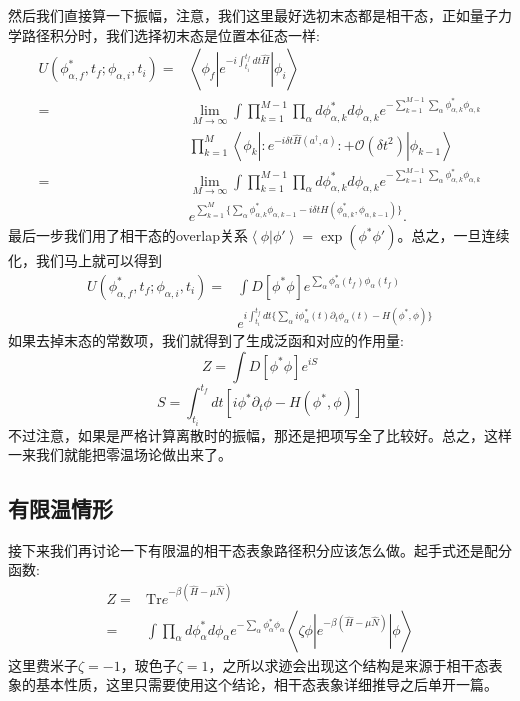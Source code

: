 \documentclass[12pt, a4paper, oneside]{ctexart}
\begin{document}
然后我们直接算一下振幅，注意，我们这里最好选初末态都是相干态，正如量子力学路径积分时，我们选择初末态是位置本征态一样:
\begin{align} 
U(\phi^*_{\alpha,f},t_f;\phi_{\alpha,i},t_i)=&\left<\phi_f |  e^{-i\int_{t_i}^{t_f}dt \hat H} | \phi_i \right>\nonumber\\ 
=&\lim_{M\rightarrow\infty}\int\prod_{k=1}^{M-1}\prod_{\alpha}d\phi^*_{\alpha,k}d\phi_{\alpha,k}e^{-\sum_{k=1}^{M-1}\sum_\alpha\phi^*_{\alpha,k}\phi_{\alpha,k}}\nonumber\\ 
&\prod_{k=1}^M\left< \phi_k | :e^{-i\delta t \hat H(a^\dagger, a)}:+\mathcal{O}(\delta t^2) |  \phi_{k-1} \right>\nonumber\\ 
=&\lim_{M\rightarrow\infty}\int\prod_{k=1}^{M-1}\prod_{\alpha}d\phi^*_{\alpha,k}d\phi_{\alpha,k}e^{-\sum_{k=1}^{M-1}\sum_\alpha\phi^*_{\alpha,k}\phi_{\alpha,k}}\nonumber\\
 &e^{\sum_{k=1}^M\{ \sum_\alpha \phi^*_{\alpha,k}\phi_{\alpha,k-1} -i\delta t H(\phi^*_{\alpha,k},\phi_{\alpha,k-1})\}}.    
\end{align}
最后一步我们用了相干态的overlap关系$\left<  \phi|\phi' \right>=\exp(\phi^*\phi')$。总之，一旦连续化，我们马上就可以得到
\begin{align} 
U(\phi^*_{\alpha,f},t_f;\phi_{\alpha,i},t_i) =&\int D[\phi^*\phi]e^{\sum_\alpha\phi^*_{\alpha}(t_f)\phi_{\alpha}(t_f)}\nonumber\\ 
&e^{i\int_{t_i}^{t_f} dt\{ \sum_\alpha i \phi^*_{\alpha}(t)\partial_t \phi_\alpha(t)-H(\phi^*,\phi) \}} 
\end{align}
如果去掉末态的常数项，我们就得到了生成泛函和对应的作用量:
\begin{equation}
    Z=\int D[\phi^*\phi]e^{iS}
\end{equation}
\begin{equation}
    S=\int_{t_i}^{t_f}dt [i\phi^*\partial_t\phi-H(\phi^*,\phi)]
\end{equation}
不过注意，如果是严格计算离散时的振幅，那还是把项写全了比较好。总之，这样一来我们就能把零温场论做出来了。

\subsection{有限温情形}
接下来我们再讨论一下有限温的相干态表象路径积分应该怎么做。起手式还是配分函数:
\begin{align}
 Z=&\mathrm{Tr} e^{-\beta(\hat H-\mu\hat N)}\nonumber\\ 
 =&\int \prod_\alpha d\phi^*_\alpha d\phi_\alpha e^{-\sum_{\alpha}\phi^*_\alpha\phi_\alpha}\left<\zeta\phi |e^{-\beta(\hat H-\mu\hat N)}| \phi  \right>  
 \end{align}
这里费米子$\zeta=-1$，玻色子$\zeta=1$，之所以求迹会出现这个结构是来源于相干态表象的基本性质，这里只需要使用这个结论，相干态表象详细推导之后单开一篇。
\end{document}
